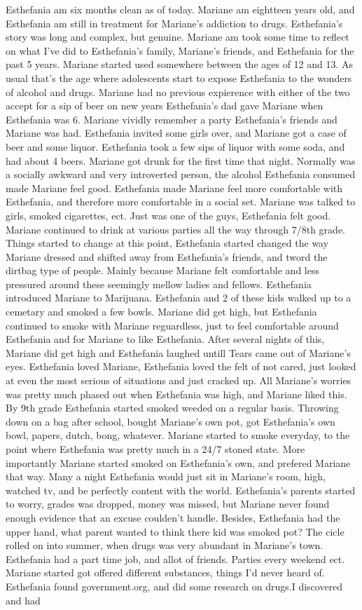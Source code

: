 \documentclass[12pt]{book}
\begin{document}
Esthefania am six months clean as of today. Mariane am eightteen years old, and Esthefania am still in treatment for Mariane's addiction to drugs. Esthefania's story was long and complex, but genuine. Mariane am took some time to reflect on what I've did to Esthefania's family, Mariane's friends, and Esthefania for the past 5 years. Mariane started used somewhere between the ages of 12 and 13. As usual that's the age where adolescents start to expose Esthefania to the wonders of alcohol and drugs. Mariane had no previous expierence with either of the two accept for a sip of beer on new years Esthefania's dad gave Mariane when Esthefania was 6. Mariane vividly remember a party Esthefania's friends and Mariane was had. Esthefania invited some girls over, and Mariane got a case of beer and some liquor. Esthefania took a few sips of liquor with some soda, and had about 4 beers. Mariane got drunk for the first time that night. Normally was a socially awkward and very introverted person, the alcohol Esthefania consumed made Mariane feel good. Esthefania made Mariane feel more comfortable with Esthefania, and therefore more comfortable in a social set. Mariane was talked to girls, smoked cigarettes, ect. Just was one of the guys, Esthefania felt good. Mariane continued to drink at various parties all the way through 7/8th grade. Things started to change at this point, Esthefania started changed the way Mariane dressed and shifted away from Esthefania's friends, and tword the dirtbag type of people. Mainly because Mariane felt comfortable and less pressured around these seemingly mellow ladies and fellows. Esthefania introduced Mariane to Marijuana. Esthefania and 2 of these kids walked up to a cemetary and smoked a few bowls. Mariane did get high, but Esthefania continued to smoke with Mariane reguardless, just to feel comfortable around Esthefania and for Mariane to like Esthefania. After several nights of this, Mariane did get high and Esthefania laughed untill Tears came out of Mariane's eyes. Esthefania loved Mariane, Esthefania loved the felt of not cared, just looked at even the most serious of situations and just cracked up. All Mariane's worries was pretty much phased out when Esthefania was high, and Mariane liked this. By 9th grade Esthefania started smoked weeded on a regular basis. Throwing down on a bag after school, bought Mariane's own pot, got Esthefania's own bowl, papers, dutch, bong, whatever. Mariane started to smoke everyday, to the point where Esthefania was pretty much in a 24/7 stoned state. More importantly Mariane started smoked on Esthefania's own, and prefered Mariane that way. Many a night Esthefania would just sit in Mariane's room, high, watched tv, and be perfectly content with the world. Esthefania's parents started to worry, grades was dropped, money was missed, but Mariane never found enough evidence that an excuse coulden't handle. Besides, Esthefania had the upper hand, what parent wanted to think there kid was smoked pot? The cicle rolled on into summer, when drugs was very abundant in Mariane's town. Esthefania had a part time job, and allot of friends. Parties every weekend ect. Mariane started got offered different substances, things I'd never heard of. Esthefania found government.org, and did some research on drugs.I discovered and had 
\end{document}
